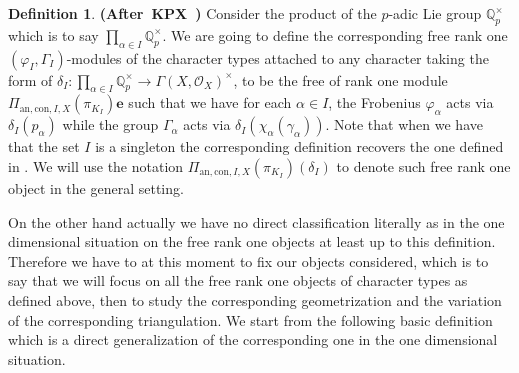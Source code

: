 \documentclass[12pt]{amsart}
\theoremstyle{definition}
\newtheorem{definition}[theorem]{Definition}
\numberwithin{equation}{section}
\begin{document}
\begin{definition} \mbox{\bf{(After KPX \cite[Notation 6.2.2]{KPX})}}
Consider the product of the $p$-adic Lie group $\mathbb{Q}_p^\times$ which is to say $\prod_{\alpha\in I}\mathbb{Q}_p^\times$. We are going to define the corresponding free rank one $(\varphi_I,\Gamma_I)$-modules of the character types attached to any character taking the form of $\delta_I:\prod_{\alpha\in I}\mathbb{Q}_p^\times\rightarrow \Gamma(X,\mathcal{O}_X)^\times$, to be the free of rank one module $\Pi_{\mathrm{an},\mathrm{con},I,X}(\pi_{K_I})\mathbf{e}$ such that we have for each $\alpha\in I$, the Frobenius $\varphi_\alpha$ acts via $\delta_I(p_\alpha)$ while the group $\Gamma_\alpha$ acts via $\delta_I(\chi_\alpha(\gamma_\alpha))$. Note that when we have that the set $I$ is a singleton the corresponding definition recovers the one defined in \cite[Notation 6.2.2]{KPX}. We will use the notation $\Pi_{\mathrm{an},\mathrm{con},I,X}(\pi_{K_I})(\delta_I)$ to denote such free rank one object in the general setting.	
\end{definition}



\indent On the other hand actually we have no direct classification literally as in the one dimensional situation on the free rank one objects at least up to this definition. Therefore we have to at this moment to fix our objects considered, which is to say that we will focus on all the free rank one objects of character types as defined above, then to study the corresponding geometrization and the variation of the corresponding triangulation. We start from the following basic definition which is a direct generalization of the corresponding one in the one dimensional situation.
\end{document}
